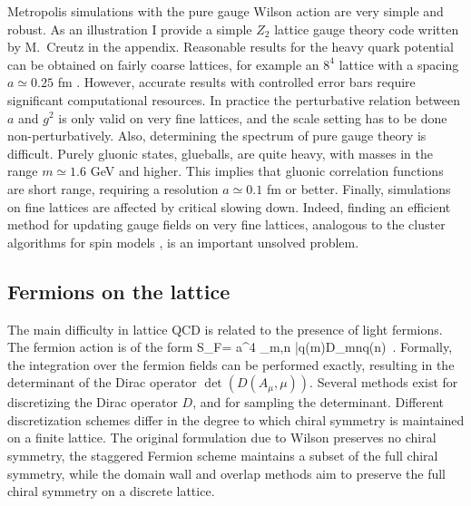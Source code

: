 Metropolis simulations with the pure gauge Wilson action are very simple 
and robust. As an illustration I provide a simple $Z_2$ lattice gauge 
theory code written by M.~Creutz in the appendix. Reasonable results for the 
heavy quark potential can be obtained on fairly coarse lattices, for example 
an $8^4$ lattice with a spacing $a\simeq 0.25$ fm \cite{Lepage:1998dt}.
However, accurate results with controlled error bars require significant 
computational resources. In practice the perturbative relation between 
$a$ and $g^2$ is only valid on very fine lattices, and the scale setting 
has to be done non-perturbatively. Also, determining the spectrum of pure 
gauge theory is difficult. Purely gluonic states, glueballs, are quite heavy, 
with masses in the range $m\simeq 1.6$ GeV and higher. This implies that 
gluonic correlation functions are short range, requiring a resolution 
$a\simeq 0.1$ fm or better. Finally, simulations on fine lattices are 
affected by critical slowing down. Indeed, finding an efficient method 
for updating gauge fields on very fine lattices, analogous to the cluster 
algorithms for spin models \cite{Wolff:1988uh}, is an important unsolved 
problem.

\subsection{Fermions on the lattice}
\label{sec_fermions}
 
 The main difficulty in lattice QCD is related to the presence
of light fermions. The fermion action is of the form
\be 
 S_F= a^4 \sum_{m,n} \bar{q}(m)D_{mn}q(n)\, . 
\ee
Formally, the integration over the fermion fields 
can be performed exactly, resulting in the determinant of the Dirac 
operator $\det(D(A_\mu,\mu))$. Several methods exist for discretizing 
the Dirac operator $D$, and for sampling the determinant. Different 
discretization schemes differ in the degree to which chiral symmetry 
is maintained on a finite lattice. The original formulation due to Wilson 
\cite{Wilson:1974sk} preserves no chiral symmetry, the staggered Fermion 
scheme \cite{Kogut:1974ag} maintains a subset of the full chiral symmetry, 
while the domain wall \cite{Kaplan:1992bt} and overlap methods
\cite{Neuberger:1997fp} aim to preserve the full chiral symmetry on 
a discrete lattice. 

